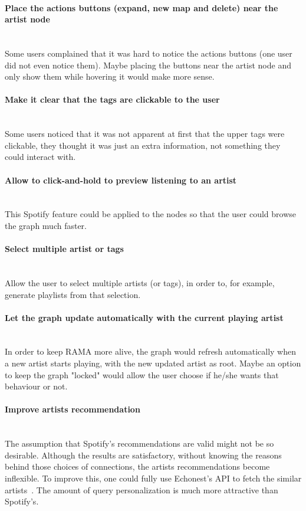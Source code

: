   \paragraph*{Place the actions buttons (expand, new map and delete) near the artist node} \hfill \\
  \indent Some users complained that it was hard to notice the actions buttons (one user did not even notice them).
  Maybe placing the buttons near the artist node and only show them while hovering it would make more sense.

  \paragraph*{Make it clear that the tags are clickable to the user} \hfill \\
  \indent Some users noticed that it was not apparent at first that the upper tags were clickable, they thought it was just an extra information, not something they could interact with.

  \paragraph*{Allow to click-and-hold to preview listening to an artist} \hfill \\
  \indent This Spotify feature could be applied to the nodes so that the user could browse the graph much faster.

  \paragraph*{Select multiple artist or tags} \hfill \\
  \indent Allow the user to select multiple artists (or tags), in order to, for example, generate playlists from that selection.

  \paragraph*{Let the graph update automatically with the current playing artist} \hfill \\
  \indent In order to keep RAMA more alive, the graph would refresh automatically when a new artist starts playing, with the new updated artist as root.
  Maybe an option to keep the graph "locked" would allow the user choose if he/she wants that behaviour or not.

  \paragraph*{Improve artists recommendation} \hfill \\
  \indent The assumption that Spotify's recommendations are valid might not be so desirable.
  Although the results are satisfactory, without knowing the reasons behind those choices of connections, the artists recommendations become inflexible.
  To improve this, one could fully use Echonest's API to fetch the similar artists~\cite{echonestsimilar}.
  The amount of query personalization is much more attractive than Spotify's.

